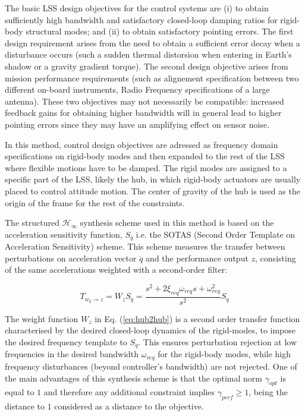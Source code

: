 \documentclass{ifacconf}
\begin{document}
The basic LSS design objectives for the control systems are (i) to obtain sufficiently high bandwidth and satisfactory closed-loop damping ratios for rigid-body structural modes; and (ii) to obtain satisfactory pointing errors. The first design requirement arises from the need to obtain a sufficient error decay when a disturbance occurs (such a sudden thermal distorsion when entering in Earth's shadow or a gravity gradient torque). The second design objective arises from mission performance requirements (such as alignement specification between two different on-board instruments, Radio Frequency specifications of a large antenna). These two objectives may not necessarily be compatible: increased feedback gains for obtaining higher bandwidth will in general lead to higher pointing errors since they may have an amplifying effect on sensor noise. 

In this method, control design objectives are adressed as frequency domain specifications on rigid-body modes and then expanded to the rest of the LSS where flexible motions have to be damped. The rigid modes are assigned to a specific part of the LSS, likely the hub, in which rigid-body actuators are usually placed to control attitude motion. The center of gravity of the hub is used as the origin of the frame for the rest of the constraints. 

The structured $\mathcal{H}_\infty$ synthesis scheme used in this method is based on the acceleration sensitivity function, $S_{\ddot{q}}$ \citep{Fezans2008_Hinf} i.e. the SOTAS (Second Order Template on Acceleration Sensitivity) scheme. This scheme measures the transfer between perturbations on acceleration vector $\ddot{q}$ and the performance output $z$, consisting of the same accelerations  weighted with a second-order filter:

\begin{equation}
\label{eq:hub2hub}
T_{w_{\ddot{q}}\rightarrow z} = W_{z} S_{\ddot{q}} = \frac{s^2 + 2 \xi_{req} \omega_{req}s + \omega_{req}^2 }{s^2} S_{\ddot{q}} 
\end{equation}

The weight function $W_{z}$ in Eq. (\ref{eq:hub2hub}) is a second order transfer function characterised by the desired closed-loop dynamics of the rigid-modes, to impose the desired frequency template to $S_{\ddot{q}}$. This ensures perturbation rejection at low frequencies in the desired bandwidth $\omega_{req}$ for the rigid-body modes, while high frequency disturbances (beyond controller's bandwidth) are not rejected. One of the main advantages of this synthesis scheme is that the optimal norm $\gamma_{opt}$ is equal to $1$ and therefore any additional constraint implies $\gamma_{perf} \geq 1$, being the distance to $1$ considered as a distance to the objective.
\end{document}

